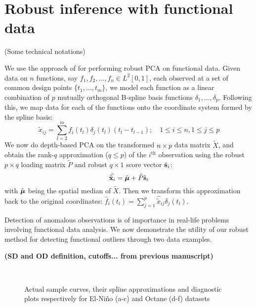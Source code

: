\documentclass[fleqn,11pt]{article}
\begin{document}
\section{Robust inference with functional data}

{\colrbf (Some technical notations)}

We use the approach of \cite{BoenteBarrera15} for performing robust PCA on functional data. Given data on $n$ functions, say $f_1, f_2, ..., f_n \in L^2[0,1]$, each observed at a set of common design points $\{ t_1, ..., t_m \} $, we model each function as a linear combination of $p$ mutually orthogonal B-spline basis functions $\delta_1, ..., \delta_p$. Following this, we map data for each of the functions onto the coordinate system formed by the spline basis:
%
\begin{equation}
\tilde x_{ij} = \sum_{l=2}^m f_i(t_l) \delta_j(t_l) (t_l - t_{l-1}); \quad 1 \leq i \leq n, 1 \leq j \leq p
\end{equation}
%
We now do depth-based PCA on the transformed $n \times p$ data matrix $\tilde X$, and obtain the rank-$q$ approximation ($q \leq p$) of the $i^\text{th}$ observation using the robust $p \times q$ loading matrix $\tilde P$ and robust $q \times 1$ score vector $\tilde{{\bf{s}}}_i$:
%
$$ \widehat{\tilde{{\bf{x}}}_i} = \tilde{{\boldsymbol{\mu}}} + \tilde P \tilde {{\bf{s}}}_i $$
%
with $\tilde{{\boldsymbol{\mu}}}$ being the spatial median of $\tilde X$. Then we transform this approximation back to the original coordinates: $\hat f_i (t_l) = \sum_{j=1}^p \widehat{ \tilde x}_{ij} \delta_j (t_l)$.

Detection of anomalous observations is of importance in real-life problems involving functional data analysis. We now demonstrate the utility of our robust method for detecting functional outliers through two data examples. 

\textbf{(SD and OD definition, cutoffs... from previous manuscript)
}

\begin{figure}[t]
\begin{center}
\\
\vspace{-1em}
\caption{Actual sample curves, their spline approximations and diagnostic plots respectively for El-Ni\~no (a-c) and Octane (d-f) datasets}
\label{fig:fPCAfig}
\end{center}
\end{figure}
\end{document}
